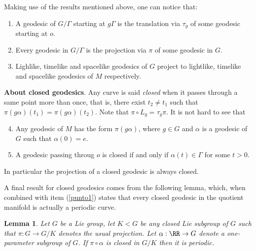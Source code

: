 \documentclass[11pt]{amsart}
\newcommand{\mgg}{\mathfrak g }
\theoremstyle{plain}
\newtheorem{lem}[thm]{Lemma}
\theoremstyle{definition}
\newtheorem{defn}[thm]{Definition}
\theoremstyle{remark}
\begin{document}
Making use of the results mentioned above, one can notice that: 

\begin{enumerate}
\item A geodesic of $G/\Gamma$ starting at $g\Gamma$ is the translation via $\tau_g$ of some geodesic starting at $o$. \label{punto1}
\item Every geodesic in $G/\Gamma$ is the projection via $\pi$ of some geodesic in $G$.\label{punto2}
\item Lighlike, timelike and spacelike geodesics of $G$ project to lightlike, timelike and spacelike geodesics of $M$ respectively.
\end{enumerate}


\textbf{About closed geodesics}. Any curve is said {\em closed } when it passes through a same point more than once, that is, there exist $t_2\neq  t_1$ such that $\pi(g\alpha)(t_1)=\pi(g\alpha)(t_2)$. Note that $\pi \circ L_g = \tau_g \pi$. It is not hard to see that 
\begin{enumerate}
\setcounter{enumi}{3}
    \item Any geodesic of $M$ has the form $\pi(g\alpha)$, where $g \in G$ and $\alpha$ is a geodesic of $G$ such that $\alpha(0)=e$. 
    
    \item A geodesic passing throug $o$ is closed if and only if  $\alpha(t) \in \Gamma$ for some $t>0$.\label{punto4}
\end{enumerate}

In particular the projection of a closed geodesic is always closed.

%

A final result for closed geodesics comes from the following lemma, which, when combined with item (\ref{punto1}) states that every closed geodesic in the quotient manifold is actually a periodic curve. 

\begin{lem}\cite{OV}  Let $G$ be a Lie group, let $K < G$ be any closed Lie  subgroup of $G$ such that  $\pi: G \to G/K$ denotes the 
usual projection. Let $\alpha: \RR \to G$ denote a  one-parameter subgroup of $G$.
If $\pi \circ \alpha$ is closed in $G/K$ then it is periodic.
\end{lem}

%

\end{document}
